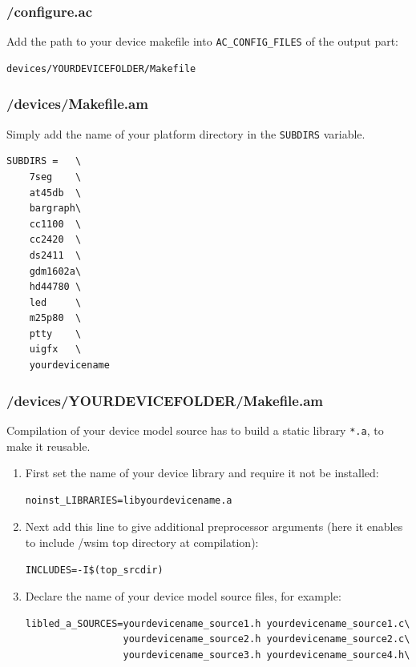 \documentclass[a4paper,10pt]{report}
\begin{document}
\subsubsection{/configure.ac}
Add the path to your device makefile into \verb$AC_CONFIG_FILES$ of the output part: 
\begin{verbatim}
devices/YOURDEVICEFOLDER/Makefile
\end{verbatim}

\subsubsection{/devices/Makefile.am}
Simply add the name of your platform directory in the \verb$SUBDIRS$ variable.
\begin{verbatim}
SUBDIRS =   \
    7seg    \
    at45db  \
    bargraph\
    cc1100  \
    cc2420  \
    ds2411  \
    gdm1602a\
    hd44780 \
    led     \
    m25p80  \
    ptty    \
    uigfx   \
    yourdevicename
\end{verbatim}

\subsubsection{/devices/YOURDEVICEFOLDER/Makefile.am}
Compilation of your device model source has to build a static library \verb$*.a$, to make it reusable.
\begin{enumerate}
  \item First set the name of your device library and require it not be installed:
\begin{verbatim}
noinst_LIBRARIES=libyourdevicename.a
\end{verbatim}

  \item Next add this line to give additional preprocessor arguments (here it enables to include /wsim top directory at compilation):
\begin{verbatim}
INCLUDES=-I$(top_srcdir)
\end{verbatim}

  \item Declare the name of your device model source files, for example:
\begin{verbatim}
libled_a_SOURCES=yourdevicename_source1.h yourdevicename_source1.c\
                 yourdevicename_source2.h yourdevicename_source2.c\
                 yourdevicename_source3.h yourdevicename_source4.h\
\end{verbatim}

\end{enumerate}
\end{document}
